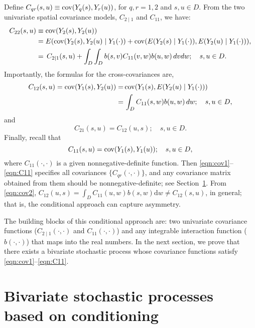 \documentclass[lineno]{biometrika}
\newcommand{\intd} {\textrm{d}}
\newcommand{\svec} {s}
\newcommand{\uvec} {u}
\newcommand{\s}{s}
\renewcommand{\v}{v}
\renewcommand{\u}{u}
\newcommand{\w}{w}
\renewcommand{\d}{d}
\newcommand{\E}{E}
\newcommand{\cov}{\mathrm{cov}}
\let\originalleft\left
\let\originalright\right
\renewcommand{\left}{\mathopen{}\mathclose\bgroup\originalleft}
\renewcommand{\right}{\aftergroup\egroup\originalright}
\begin{document}
Define $C_{qr}(\s,\u)\equiv \cov\left(Y_{q}(\s),Y_r(\u)\right)$, for $q,r=1,2$ and $\s,\u\in D$. From the two univariate spatial covariance models, $C_{2\mid 1}$ and $C_{11}$, we have:
\begin{align}
C_{22}(\s,\u)&\equiv\cov\left(Y_2(\s),Y_2(\u)\right) \nonumber \\
&=E\left(\cov(Y_2(\s),Y_2(\u)\mid Y_1(\cdot)\right)+ \cov\left(\E\left(Y_2(\s)\mid Y_1(\cdot)\right),\E\left(Y_2(\u)\mid Y_1(\cdot)\right)\right),\nonumber\\
&=\,C_{2\mid 1}(\s,\u)+\int_D\int_{D}{b(\s,\v)C_{11}(\v,\w)b(\u,\w)\,\d\v\d\w};\quad\s,\u\in D.\label{eqn:cov1}
\end{align}
Importantly, the formulas for the cross-covariances are,
\begin{align}
C_{12}(\s,\u)=\cov\left(Y_1(\s),Y_2(\u)\right)=&\,\cov\left(Y_1(\s),E(Y_2(\u)\mid Y_1(\cdot))\right)\nonumber\\
=&\,\int_D{C_{11}(\s,\w)b(\u,\w)\,\d \w};\quad\s,\u\in D,\label{eqn:cov2}
\end{align}
and
\begin{equation}\label{eqn:C21}
 C_{21}(\s,\u)=C_{12}(\u,\s);\quad \s,\u\in D.
\end{equation}
Finally, recall that
\begin{equation}\label{eqn:C11}
C_{11}(\s,\u)=\cov\left(Y_1(\s),Y_1(\u)\right);\quad\s,\u\in D,
\end{equation}
where $C_{11}(\cdot,\cdot)$ is a given nonnegative-definite function. Then \eqref{eqn:cov1}--\eqref{eqn:C11} specifies all covariances $\{C_{qr}(\cdot,\cdot)\}$, and any covariance matrix obtained from them should be nonnegative-definite; see Section~\ref{sec:3}. From \eqref{eqn:cov2}, $C_{12}(\uvec,\svec) = \int_DC_{11}(\uvec,\w)b(\svec,\w)\intd\w \ne C_{12}(\svec,\uvec)$, in general; that is, the conditional approach can capture asymmetry.

The building blocks of this conditional approach are: two univariate covariance functions ($C_{2\mid 1}(\cdot,\cdot)$ and $C_{11}(\cdot,\cdot)$) and any integrable interaction function ($b(\cdot,\cdot)$) that maps into the real numbers. In the next section, we prove that there exists a bivariate stochastic process whose covariance functions satisfy \eqref{eqn:cov1}--\eqref{eqn:C11}.

\section{Bivariate stochastic processes based on conditioning}\label{sec:3}
\end{document}
